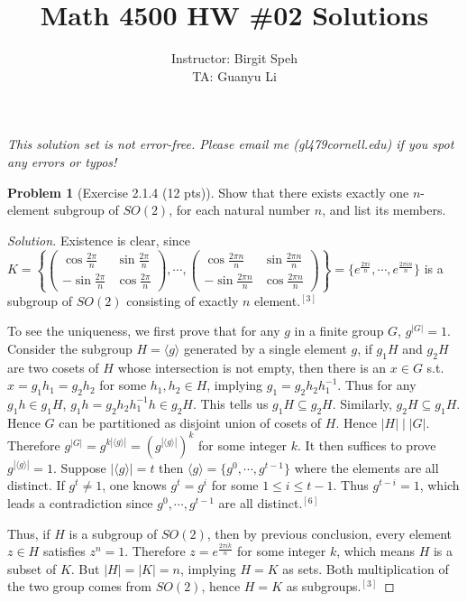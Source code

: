 \documentclass{article}
\title{Math 4500 HW \#02 Solutions}
\author{Instructor: Birgit Speh\\ TA: Guanyu Li}
\date{}
\theoremstyle{definition}
\newtheorem{problem}{Problem}
\theoremstyle{plain}
\begin{document}
\maketitle\par

\emph{This solution set is not error-free. Please email me (gl479\MVAt cornell.edu) if you spot any errors or typos!}

\begin{problem}[Exercise 2.1.4 (12 pts)]Show that there exists exactly one $n$-element subgroup of $SO(2)$, for each natural number $n$, and list its members.
\end{problem}
\begin{adjustwidth}{0.7cm}{}
\color{blue}
\begin{proof}[Solution]Existence is clear, since $K=\left\{\begin{pmatrix}\cos\frac{2\pi}{n}&\sin\frac{2\pi}{n}\\ -\sin\frac{2\pi}{n}&\cos\frac{2\pi}{n}\end{pmatrix},\cdots,\begin{pmatrix}\cos\frac{2\pi n}{n}&\sin\frac{2\pi n}{n}\\ -\sin\frac{2\pi n}{n}&\cos\frac{2\pi n}{n}\end{pmatrix}\right\}=\{e^\frac{2\pi i}{n},\cdots,e^\frac{2\pi in}{n}\}$ is a subgroup of $SO(2)$ consisting of exactly $n$ element$.^{[3]}$\par
To see the uniqueness, we first prove that for any $g$ in a finite group $G$, $g^{|G|}=1$. Consider the subgroup $H=\langle g\rangle$ generated by a single element $g$, if $g_1H$ and $g_2H$ are two cosets of $H$ whose intersection is not empty, then there is an $x\in G$ s.t. $x=g_1h_1=g_2h_2$ for some $h_1,h_2\in H$, implying $g_1=g_2h_2h_1^{-1}$. Thus for any $g_1h\in g_1H$, $g_1h=g_2h_2h_1^{-1}h\in g_2H$. This tells us $g_1H\subseteq g_2H$. Similarly, $g_2H\subseteq g_1H$. Hence $G$ can be partitioned as disjoint union of cosets of $H$. Hence $|H|\mid|G|$. Therefore $g^{|G|}=g^{k|\langle g\rangle|}=(g^{|\langle g\rangle|})^k$ for some integer $k$. It then suffices to prove $g^{|\langle g\rangle|}=1$. Suppose $|\langle g\rangle|=t$ then $\langle g\rangle=\{g^0,\cdots,g^{t-1}\}$ where the elements are all distinct. If $g^t\neq1$, one knows $g^t=g^i$ for some $1\leq i\leq t-1$. Thus $g^{t-i}=1$, which leads a contradiction since $g^0,\cdots,g^{t-1}$ are all distinct$.^{[6]}$\par
Thus, if $H$ is a subgroup of $SO(2)$, then by previous conclusion, every element $z\in H$ satisfies $z^n=1$. Therefore $z=e^\frac{2\pi ik}{n}$ for some integer $k$, which means $H$ is a subset of $K$. But $|H|=|K|=n$, implying $H=K$ as sets. Both multiplication of the two group comes from $SO(2)$, hence $H=K$ as subgroups$.^{[3]}$
\color{black}
\end{proof}
\end{adjustwidth}
\end{document}
